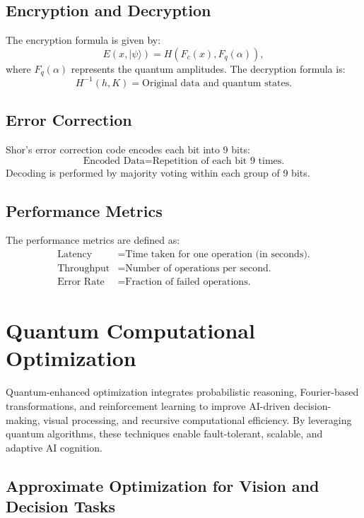 \documentclass{article}
\theoremstyle{plain}
\begin{document}
\subsection{Encryption and Decryption}
The encryption formula is given by:
\begin{equation}
E(x, |\psi\rangle) = H(F_c(x), F_q(\alpha)),
\end{equation}
where $F_q(\alpha)$ represents the quantum amplitudes. The decryption formula is:
\begin{equation}
H^{-1}(h, K) = \text{Original data and quantum states.}
\end{equation}

\subsection{Error Correction}
Shor's error correction code encodes each bit into 9 bits:
\begin{equation}
\text{Encoded Data} = \text{Repetition of each bit 9 times.}
\end{equation}
Decoding is performed by majority voting within each group of 9 bits.

\subsection{Performance Metrics}
The performance metrics are defined as:
\begin{align}
\text{Latency} &= \text{Time taken for one operation (in seconds).} \\
\text{Throughput} &= \text{Number of operations per second.} \\
\text{Error Rate} &= \text{Fraction of failed operations.}
\end{align}

   
\section{Quantum  Computational Optimization}

Quantum-enhanced optimization integrates probabilistic reasoning, Fourier-based transformations, and reinforcement learning to improve AI-driven decision-making, visual processing, and recursive computational efficiency. By leveraging quantum algorithms, these techniques enable fault-tolerant, scalable, and adaptive AI cognition.

\subsection{Approximate Optimization for Vision and Decision Tasks}
\end{document}
